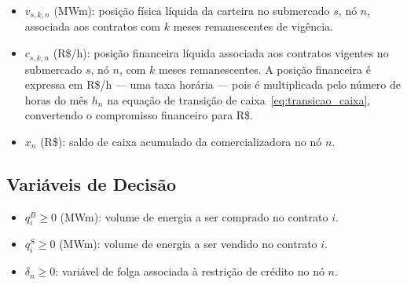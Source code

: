 \begin{itemize}
  \item $v_{s,k,n}$ (MWm): posi\c{c}\~ao f\'isica l\'iquida da carteira no submercado $s$, n\'o $n$, associada aos contratos com $k$ meses remanescentes de vig\^encia.
  \item $c_{s,k,n}$ (R\$/h): posi\c{c}\~ao financeira l\'iquida associada aos contratos vigentes no submercado $s$, n\'o $n$, com $k$ meses remanescentes. A posi\c{c}\~ao financeira \'e expressa em R\$/h --- uma taxa hor\'aria --- pois \'e multiplicada pelo n\'umero de horas do m\^es $h_n$ na equa\c{c}\~ao de transi\c{c}\~ao de caixa~\eqref{eq:transicao_caixa}, convertendo o compromisso financeiro para R\$.
  \item $x_n$ (R\$): saldo de caixa acumulado da comercializadora no n\'o $n$.
\end{itemize}

\subsection*{Vari\'aveis de Decis\~ao}

\begin{itemize}
  \item $q^B_i \geq 0$ (MWm): volume de energia a ser comprado no contrato $i$.
  \item $q^S_i \geq 0$ (MWm): volume de energia a ser vendido no contrato $i$.
  \item $\delta_n \geq 0$: vari\'avel de folga associada \`a restri\c{c}\~ao de cr\'edito no n\'o $n$.
\end{itemize}
